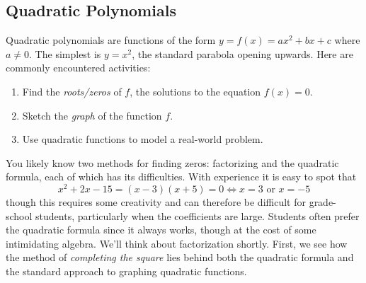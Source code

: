% 

\clearpage

\subsection{Quadratic Polynomials}

Quadratic polynomials are functions of the form $y=f(x)=ax^2+bx+c$ where $a\neq 0$. The simplest is $y=x^2$, the standard parabola opening upwards. Here are commonly encountered activities:
\begin{enumerate}\itemsep0pt
  \item Find the \emph{roots/zeros} of $f$, the solutions to the equation $f(x)=0$.
  \item Sketch the \emph{graph} of the function $f$.
  \item Use quadratic functions to model a real-world problem.
\end{enumerate}

You likely know two methods for finding zeros: factorizing and the quadratic formula, each of which has its difficulties. With experience it is easy to spot that 
\[x^2+2x-15=(x-3)(x+5)=0\iff x=3\text{ or }x=-5\]
though this requires some creativity and can therefore be difficult for grade-school students, particularly when the coefficients are large. Students often prefer the quadratic formula since it always works, though at the cost of some intimidating algebra.
We'll think about factorization shortly. First, we see how the method of \emph{completing the square} lies behind both the quadratic formula and the standard approach to graphing quadratic functions.

